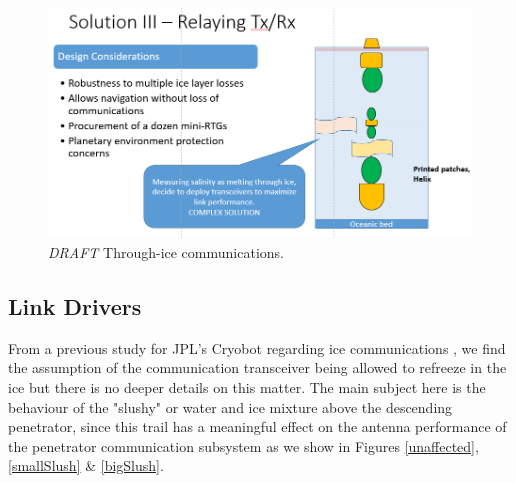 \begin{figure}[htb]
	\centering
	\includegraphics[width=\textwidth]{figures/comms/iceLink-relay}
	\caption{\textit{DRAFT} Through-ice communications.}
	\label{fig:through-ice_comms}
\end{figure}

\subsection{Link Drivers}






From a previous study for JPL's Cryobot regarding ice communications \cite{iceLink-scott}, we find the assumption of the communication transceiver being allowed to refreeze in the ice but there is no deeper details on this matter. The main subject here is the behaviour of the "slushy" or water and ice mixture above the descending penetrator, since this trail has a meaningful effect on the antenna performance of the penetrator communication subsystem as we show in Figures \ref{unaffected}, \ref{smallSlush} \& \ref{bigSlush}.

